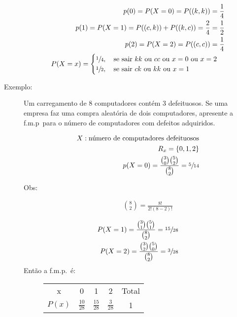 \begin{description}
       \begin{align*}
         p(0)=P(X=0)=P((k,k))=\frac{1}{4} \\
         p(1)=P(X=1)=P((c,k))+P((k,c))=\frac{2}{4}=\frac{1}{2}\\
         p(2)=P(X=2)=P((c,c))=\frac{1}{4}\\
         P(X=x)= \begin{cases}
           \sfrac{1}{4}, \text{\quad se sair $kk$ ou $cc$ ou $x=0$ ou $x=2$}\\
           \sfrac{1}{2}, \text{\quad se sair $ck$ ou $kk$ ou $x=1$ }
         \end{cases}
       \end{align*}

     \item [Exemplo:] Um carregamento de 8 computadores contém 3 defeituosos. Se uma empresa faz uma compra aleatória de dois computadores, apresente a f.m.p\ para o número de computadores com defeitos adquiridos.

       \begin{align*}   X: \text{número de computadores defeituosos}\\
         R_x = \{0,1,2\} \\
         p(X=0) = \frac{ \tbinom{3}{0} \tbinom{5}{2} }{ \binom{8}{2} }= \sfrac{5}{14}
       \end{align*}
       \begin{description}
         \item [Obs:]
           \begin{align*}
             \binom{8}{2} = \frac{8!}{2!\left( 8-2 \right)!}
           \end{align*} 
       \end{description}

       \begin{align*}
         P(X=1) = \frac{ \binom{3}{1} \binom{5}{1} }{ \binom{8}{2}}= \sfrac{15}{28} \\
         P(X=2) = \frac{ \binom{3}{2} \binom{5}{0} }{ \binom{8}{2}}=\sfrac{ 3}{28} 
       \end{align*}
       Então a f.m.p.\ é:
       \begin{figure}[H]
         \centering
         \begin{tabular}{ c c c c c}
           \toprule
           x &0&1&2&Total \\ \cmidrule{2-4}
           $P(x)$&$\frac{10}{28}$&$\frac{15}{28}$&$ \frac{3}{28}$&1\\    \bottomrule
         \end{tabular}
       \end{figure}


\end{description}
